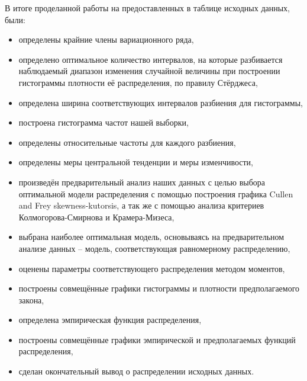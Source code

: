 \documentclass[14pt,a4paper]{scrartcl}
\begin{document}
В итоге проделанной работы на предоставленных в таблице исходных данных, были:
\begin{itemize}
	\item определены крайние члены вариационного ряда,
	\item определено оптимальное количество интервалов, на которые разбивается наблюдаемый диапазон изменения случайной величины при построении гистограммы плотности её распределения, по правилу Стёрджеса,
	\item определена ширина соответствующих интервалов разбиения для гистограммы,
	\item построена гистограмма частот нашей выборки,
	\item определены относительные частоты для каждого разбиения,
	\item определены меры центральной тенденции и меры изменчивости,
	\item произведён предварительный анализ наших данных с целью выбора оптимальной модели распределения с помощью построения графика Cullen and Frey skewness-kutorsis, а так же с помощью анализа критериев Колмогорова-Смирнова и Крамера-Мизеса,
	\item выбрана наиболее оптимальная модель, основываясь на предварительном анализе данных -- модель, соответствующая равномерному распределению,
	\item оценены параметры соответствующего распределения методом моментов,
	\item построены совмещённые графики гистограммы и плотности предполагаемого закона,
	\item определена эмпирическая функция распределения,
	\item построены совмещённые графики эмпирической и предполагаемых функций распределения,
	\item сделан окончательный вывод о распределении исходных данных.
\end{itemize}
\end{document}
